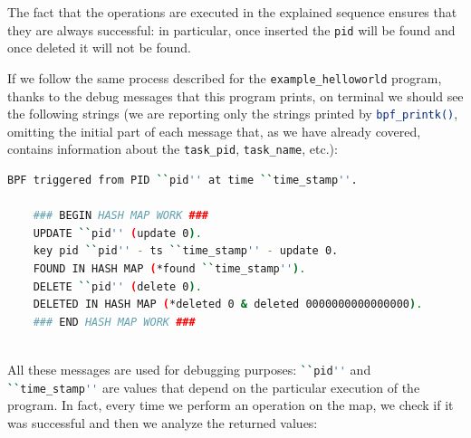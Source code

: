 The fact that the operations are executed in the explained sequence ensures that they are always successful: in particular, once inserted the \colorbox{backcolour}{\lstinline[style=commandline, language=bash, breaklines=true]|pid|} will be found and once deleted it will not be found.

If we follow the same process described for the \colorbox{backcolour}{\lstinline[style=commandline, language=bash, breaklines=true]|example_helloworld|} program, thanks to the debug messages that this program prints, on terminal we should see the following strings (we are reporting only the strings printed by \colorbox{backcolour}{\lstinline[style=commandline, language=bash, breaklines=true]|bpf_printk()|}, omitting the initial part of each message that, as we have already covered, contains information about the \colorbox{backcolour}{\lstinline[style=commandline, language=bash, breaklines=true]|task_pid|}, \colorbox{backcolour}{\lstinline[style=commandline, language=bash, breaklines=true]|task_name|}, etc.):

\begin{lstlisting}[style=commandline, language=bash, caption={Debug messages printed by the program that uses a map in libbpf-bootstrap.}]
	BPF triggered from PID ``pid'' at time ``time_stamp''.
	
	### BEGIN HASH MAP WORK ###
	UPDATE ``pid'' (update 0).
	key pid ``pid'' - ts ``time_stamp'' - update 0.
	FOUND IN HASH MAP (*found ``time_stamp'').
	DELETE ``pid'' (delete 0).
	DELETED IN HASH MAP (*deleted 0 & deleted 0000000000000000).
	### END HASH MAP WORK ###
	
\end{lstlisting}

All these messages are used for debugging purposes:  \colorbox{backcolour}{\lstinline[style=commandline, language=bash, breaklines=true]|``pid''|} and \colorbox{backcolour}{\lstinline[style=commandline, language=bash, breaklines=true]|``time_stamp''|} are values that depend on the particular execution of the program.
In fact, every time we perform an operation on the map, we check if it was successful and then we analyze the returned values:

